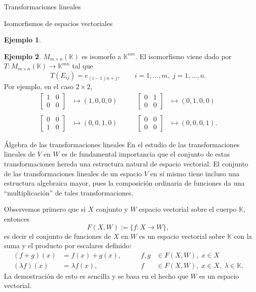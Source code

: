 \documentclass[a4paper,12pt,twoside,spanish]{amsbook}
\theoremstyle{definition}
\newtheorem{ejemplo}{Ejemplo}[section]
\theoremstyle{remark}
\newcommand{\K}{\mathbb K}
\begin{document}
\begin{chapter}{Transformaciones lineales}
\begin{section}{Isomorfismos de espacios vectoriales}
\begin{ejemplo}
	\end{ejemplo}

	\begin{ejemplo} $M_{m \times n}(\K)$  es isomorfo a $\K^{mn}$. El isomorfismo viene dado por $T: M_{m \times n}(\K) \to \K^{mn}$ tal que
		$$
		T(E_{ij}) = e_{(i-1)n+j}, \qquad i=1,\ldots, m,\; j=1,\ldots, n.
		$$
	Por  ejemplo, en el caso  $2 \times 2$,
	\begin{equation*}
	\begin{array}{llll}
	\begin{bmatrix} 1&0\\0&0\end{bmatrix} &\mapsto (1,0,0,0) \qquad&
	\begin{bmatrix} 0&1\\0&0\end{bmatrix} &\mapsto (0,1,0,0) \\
	&&&\\
	\begin{bmatrix} 0&0\\1&0\end{bmatrix} &\mapsto (0,0,1,0) &
	\begin{bmatrix} 0&0\\0&0\end{bmatrix} &\mapsto (0,0,0,1).
	\end{array}
	\end{equation*}	 
		
	\end{ejemplo}
	
		\end{section}
	
		\begin{section}{Álgebra de las transformaciones lineales}
			En el estudio de las transformaciones lineales de $V$ en $W$ es de fundamental importancia que el conjunto de estas transformaciones hereda una estructura natural de espacio vectorial. El conjunto de las transformaciones lineales de un espacio $V$ en sí mismo tiene incluso una estructura algebraica mayor, pues la composición ordinaria de funciones da una ``multiplicación'' de tales transformaciones. 
			
			
			Observemos primero que si $X$ conjunto y $W$ espacio vectorial sobre el cuerpo $\K$,  entonces
			$$
			F(X,W) := \{f:X\to W\},
			$$ 
			es decir el conjunto de funciones de $X$ en $W$ es un espacio vectorial sobre $\K$ con la suma y el producto por escalares definido:
			\begin{equation*}
			\begin{array}{rlcl}
			(f+g)(x) &= f(x)+ g(x),\qquad &f,g& \in F(X,W),\; x \in X\\
			(\lambda f)(x) &= \lambda f(x), & f& \in F(X,W),\; x \in X, \; \lambda \in \K.
			\end{array}
			\end{equation*}
			La demostración de esto es sencilla y se basa en el hecho que $W$  es un espacio vectorial. 
			

\end{section}
\end{chapter}
\end{document}

